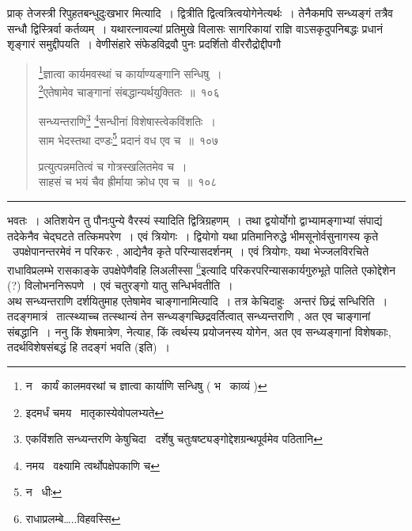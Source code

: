 \documentclass[11pt, openany]{book}
\begin{document}
प्राक् {\qt तेजस्त्री रिपुहतबन्धुदुःखभार} मित्यादि~। द्वित्रीति द्वित्वत्रित्वयोगेनेत्यर्थः~। तेनैकमपि सन्ध्यङ्गं तत्रैव सन्धौ द्विस्त्रिर्वा कर्तव्यम्~। यथारत्नावल्यां प्रतिमुखे विलासः सागरिकायां राज्ञि वाऽसकृदुपनिबद्धः प्रधानं शृङ्गारं समुद्दीपयति~। वेणीसंहारे संफेडविद्रवौ पुनः प्रदर्शितो वीररौद्रोद्दीपगौ

\newpage

\begin{quote}
{\na \renewcommand{\thefootnote}{1}\footnote{न \textendash\ कार्यं कालमवरथां च ज्ञात्वा कार्याणि सन्धिषु ( भ \textendash\ काव्यं )}ज्ञात्वा कार्यमवस्थां च कार्याण्यङ्गानि सन्धिषु~।\\
\renewcommand{\thefootnote}{2}\footnote{इदमर्धं चमय \textendash\ मातृकास्येवोपलभ्यते}एतेषामेव चाङ्गानां संबद्धान्यर्थयुक्तितः~॥~१०६

सन्ध्यन्तराणि\renewcommand{\thefootnote}{3}\footnote{एकविंशति सन्ध्यन्तरणि केषुचिदा \textendash\ दर्शेषु चतुःषष्ट्यङ्गोद्देशग्रन्थपूर्वमेव पठितानि} \renewcommand{\thefootnote}{4}\footnote{नमय \textendash\ वक्ष्यामि त्वर्थोपक्षेपकाणि च}सन्धीनां विशेषास्त्वेकविंशतिः~।\\
साम भेदस्तथा दण्डः\renewcommand{\thefootnote}{5}\footnote{न \textendash\ धीः} प्रदानं वध एव च~॥~१०७

प्रत्युत्पन्नमतित्वं च गोत्रस्खलितमेव च~।\\
साहसं च भयं चैव ह्रीर्माया क्रोध एव च~॥~१०८}
\end{quote}

\hrule

\vspace{2mm}
\noindent
भवतः~। अतिशयेन तु पौनःपुन्ये वैरस्यं स्यादिति द्वित्रिग्रहणम्~। तथा द्वयोर्योगो द्वाभ्यामङ्गाभ्यां संपाद्यं तदेकेनैव चेद्घटते तत्किमपरेण~। एवं त्रियोगः~। द्वियोगो यथा प्रतिमानिरुद्धे भीमसूनोर्वसुनागस्य कृते \textendash\ उपक्षेपानन्तरमेवं न परिकरः , आद्येनैव कृते परिन्यासदर्शनम्~। एवं त्रियोगः, यथा भेज्जलविरचिते राधाविप्रलम्भे रासकाङ्के उपक्षेपेणैवहि {\qt लिअलीस्सा} \renewcommand{\thefootnote}{*}\footnote{राधाप्रलम्बे\ldots..{\qt विहवस्सि}}इत्यादि परिकरपरिन्यासकार्यगुरुभूते पालिते एकोद्देशेन (?) विलोभननिरूपणे~। एवं चतुरङ्गो यातु सन्धिर्भवतीति~।\\

अथ सन्ध्यन्तराणि दर्शयितुमाह {\qt एतेषामेव चाङ्गानामित्यादि}~। तत्र केचिदाहुः \textendash\ अन्तरं छिद्रं सन्धिरिति~। तदङ्गमात्रं \textendash\ तात्स्थ्याच्च तत्स्थान्यं तेन सन्ध्यङ्गच्छिद्रवर्तित्वात् सन्ध्यन्तराणि , अत एव चाङ्गानां संबद्धानि~। ननु किं शेषमात्रेण, नेत्याह, किं त्वर्थस्य प्रयोजनस्य योगेन, अत एव सन्ध्यङ्गानां विशेषकाः, तदर्थविशेषसंबद्धं हि तदङ्गं भवति (इति)~।\\
\end{document}
